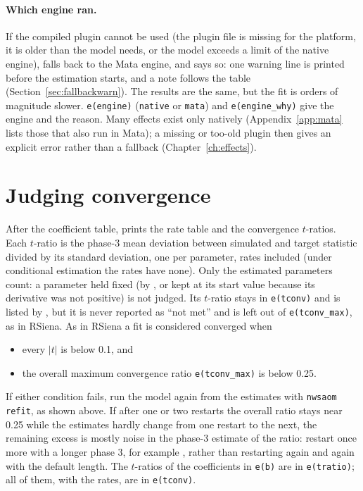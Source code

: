 \paragraph{Which engine ran.} If the compiled plugin cannot be used (the plugin file is missing for the platform, it is older than the model needs, or the model exceeds a limit of the native engine), \nwsaom{} falls back to the Mata engine, and says so: one warning line is printed before the estimation starts, and a note follows the table (Section~\ref{sec:fallbackwarn}). The results are the same, but the fit is orders of magnitude slower. \texttt{e(engine)} (\texttt{native} or \texttt{mata}) and \texttt{e(engine\_why)} give the engine and the reason. Many effects exist only natively (Appendix~\ref{app:mata} lists those that also run in Mata); a missing or too-old plugin then gives an explicit error rather than a fallback (Chapter~\ref{ch:effects}).

\section{Judging convergence}
After the coefficient table, \nwsaom{} prints the rate table and the convergence $t$-ratios. Each $t$-ratio is the phase-3 mean deviation between simulated and target statistic divided by its standard deviation, one per parameter, rates included (under conditional estimation the rates have none). Only the estimated parameters count: a parameter held fixed (by , or kept at its start value because its derivative was not positive) is not judged. Its $t$-ratio stays in \texttt{e(tconv)} and is listed by , but it is never reported as ``not met'' and is left out of \texttt{e(tconv\_max)}, as in RSiena. As in RSiena a fit is considered converged when
\begin{itemize}
\item every $|t|$ is below 0.1, and
\item the overall maximum convergence ratio \texttt{e(tconv\_max)} is below 0.25.
\end{itemize}
If either condition fails, run the model again from the estimates with \texttt{nwsaom refit}, as shown above. If after one or two restarts the overall ratio stays near 0.25 while the estimates hardly change from one restart to the next, the remaining excess is mostly noise in the phase-3 estimate of the ratio: restart once more with a longer phase 3, for example , rather than restarting again and again with the default length. The $t$-ratios of the coefficients in \texttt{e(b)} are in \texttt{e(tratio)}; all of them, with the rates, are in \texttt{e(tconv)}.

